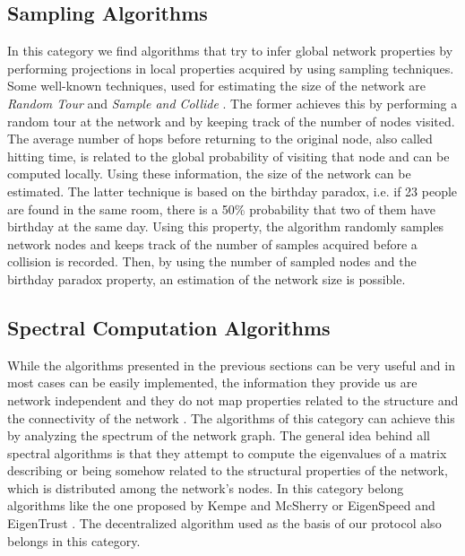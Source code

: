 \documentclass[MSc]{icldt}
\begin{document}
\subsection{Sampling Algorithms}

In this category we find algorithms that try to infer global network properties by performing projections in local properties acquired by using sampling techniques. Some well-known techniques, used for estimating the size of the network are \textit{Random Tour} and \textit{Sample and Collide} \cite{Massoulie:2006:PCS:1146381.1146402}. The former achieves this by performing a random tour at the network and by keeping track of the number of nodes visited. The average number of hops before returning to the original node, also called hitting time, is related to the global probability of visiting that node and can be computed locally. Using these information, the size of the network can be estimated. The latter technique is based on the birthday paradox, i.e. if 23 people are found in the same room, there is a 50\% probability that two of them have birthday at the same day. Using this property, the algorithm randomly samples network nodes and keeps track of the number of samples acquired before a collision is recorded. Then, by using the number of sampled nodes and the birthday paradox property, an estimation of the network size is possible.


\subsection{Spectral Computation Algorithms }

While the algorithms presented in the previous sections can be very useful and in most cases can be easily implemented, the information they provide us are network independent and they do not map properties related to the structure and the connectivity of the network \cite{6195806}. The algorithms of this category can achieve this by analyzing the spectrum of the network graph. The general idea behind all spectral algorithms is that they attempt to compute the eigenvalues of a matrix describing or being somehow related to the structural properties of the network, which is distributed among the network's nodes. In this category belong algorithms like the one proposed by Kempe and McSherry or EigenSpeed and EigenTrust \cite{Kempe:2004:DAS:1007352.1007438} \cite{Kamvar:2003:EAR:775152.775242} \cite{Snader:2009:ESP:1855663.1855672}. The decentralized algorithm used as the basis of our protocol also belongs in this category.
\end{document}
